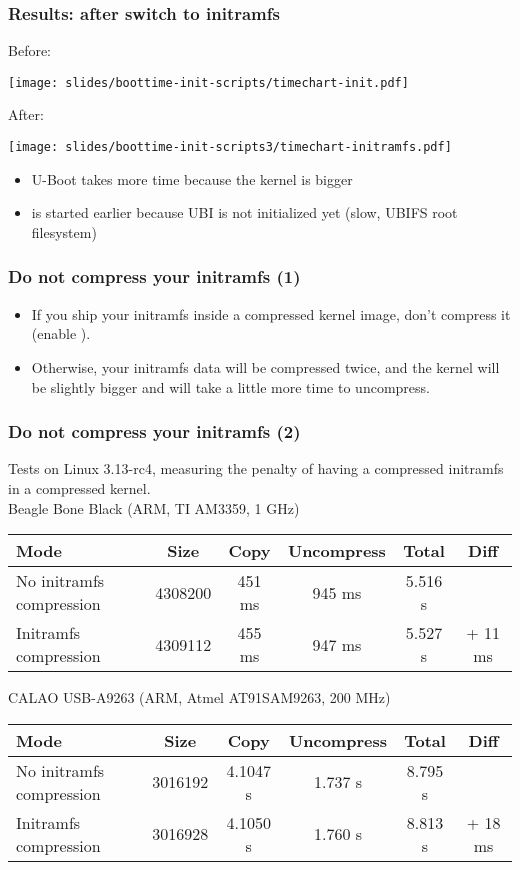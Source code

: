 \begin{frame}
\frametitle{Results: after switch to initramfs}
Before:
\begin{center}
    \texttt{[image: slides/boottime-init-scripts/timechart-init.pdf]}
\end{center}
After:
\begin{center}
    \texttt{[image: slides/boottime-init-scripts3/timechart-initramfs.pdf]}
\end{center}
\begin{itemize}
\item U-Boot takes more time because the kernel is bigger
\item {} is started earlier because UBI is not initialized yet
      (slow, UBIFS root filesystem)
\end{itemize}
\end{frame}

\begin{frame}
\frametitle{Do not compress your initramfs (1)}
\begin{itemize}
\item If you ship your initramfs inside a compressed kernel image, don't compress
      it \\
      (enable ).
\item Otherwise, your initramfs data will be compressed twice, and
      the kernel will be slightly bigger and will take a little more time to uncompress.
\end{itemize}
\end{frame}

\begin{frame}
\frametitle{Do not compress your initramfs (2)}
Tests on Linux 3.13-rc4, measuring the penalty of having a
 compressed initramfs in a  compressed kernel. \\
\vfill{}
\scriptsize
Beagle Bone Black (ARM, TI AM3359, 1 GHz)
\begin{tabular}{| l || c | c | c | c | c | }
\hline
Mode & Size & Copy & Uncompress & Total & Diff \\
\hline
No initramfs compression & 4308200 & 451 ms & 945 ms & 5.516 s & \\
Initramfs compression & 4309112 & 455 ms & 947 ms & 5.527 s & + 11 ms \\
\hline
\end{tabular}
\newline\newline
CALAO USB-A9263 (ARM, Atmel AT91SAM9263, 200 MHz)
\begin{tabular}{| l || c | c | c | c | c | }
\hline
Mode & Size & Copy & Uncompress & Total & Diff \\
\hline
No initramfs compression & 3016192 & 4.1047 s & 1.737 s & 8.795 s & \\
Initramfs compression & 3016928 & 4.1050 s & 1.760 s  & 8.813 s & + 18 ms \\
\hline
\end{tabular}
\end{frame}

